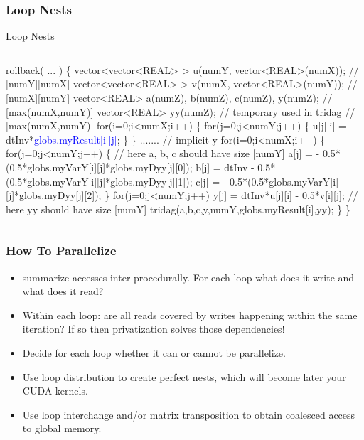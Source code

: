 \documentclass{beamer}
\newcommand{\blue}[1]{\textcolor{Blue}{{#1}}}
\begin{document}
\begin{frame}[fragile,t]
  \frametitle{Loop Nests} %

\begin{block}{Loop Nests}
\begin{columns}
\begin{colorcode}
rollback( ... ) \{
  vector<vector<REAL> > u(numY, vector<REAL>(numX));   // [numY][numX]
  vector<vector<REAL> > v(numX, vector<REAL>(numY));   // [numX][numY]
  vector<REAL> a(numZ), b(numZ), c(numZ), y(numZ);     // [max(numX,numY)] 
  vector<REAL> yy(numZ);  // temporary used in tridag  // [max(numX,numY)]
  for(i=0;i<numX;i++) \{
    for(j=0;j<numY;j++) \{
      u[j][i] = dtInv*\blue{globs.\alert{myResult[i][j]}};
  \} \}  .......
  // implicit y
  for(i=0;i<numX;i++) \{ 
    for(j=0;j<numY;j++) \{  // here a, b, c should have size [numY]
      a[j] =		 - 0.5*(0.5*globs.myVarY[i][j]*globs.myDyy[j][0]);
      b[j] = dtInv - 0.5*(0.5*globs.myVarY[i][j]*globs.myDyy[j][1]);
      c[j] =		 - 0.5*(0.5*globs.myVarY[i][j]*globs.myDyy[j][2]);
    \}
    for(j=0;j<numY;j++)
      y[j] = dtInv*u[j][i] - 0.5*v[i][j];
    // here yy should have size [numY]
    tridag(a,b,c,y,numY,globs.\alert{myResult[i]},yy);
  \} \}
\end{colorcode}
\end{columns}
\end{block} 

\end{frame}


\begin{frame}[fragile,t]
  \frametitle{How To Parallelize} %

\begin{itemize}
    \item summarize accesses inter-procedurally. 
            For each loop what does it write and what does it read?\medskip
    \item Within each loop: are all reads covered by writes
            happening within the same iteration?
            If so then privatization solves those dependencies!\medskip
    \item Decide for each loop whether it can or cannot be parallelize.\medskip
    \item Use loop distribution to create perfect nests,
            which will become later your CUDA kernels.\medskip
    \item Use loop interchange and/or matrix transposition
            to obtain coalesced access to global memory.
\end{itemize}
\end{frame}
\end{document}
